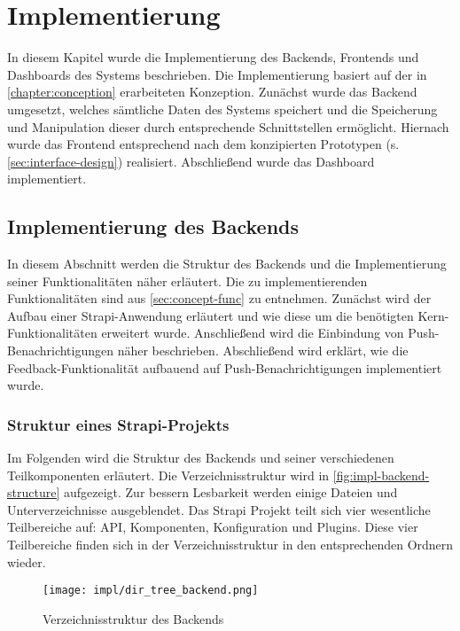 \chapter{Implementierung} \label{chapter:implementation}

In diesem Kapitel wurde die Implementierung des Backends, Frontends und
Dashboards des Systems beschrieben. Die Implementierung basiert auf der in
\autoref{chapter:conception} erarbeiteten Konzeption.  Zunächst wurde das
Backend umgesetzt, welches sämtliche Daten des Systems speichert und die
Speicherung und Manipulation dieser durch entsprechende Schnittstellen
ermöglicht. Hiernach wurde das Frontend entsprechend nach dem konzipierten
Prototypen (s. \autoref{sec:interface-design}) realisiert. Abschließend wurde
das Dashboard implementiert.

\section{Implementierung des Backends}

In diesem Abschnitt werden die Struktur des Backends und die Implementierung
seiner Funktionalitäten näher erläutert. Die zu implementierenden
Funktionalitäten sind aus \autoref{sec:concept-func} zu entnehmen. Zunächst wird
der Aufbau einer Strapi-Anwendung erläutert und wie diese um die benötigten
Kern-Funktionalitäten erweitert wurde. Anschließend wird die Einbindung von
Push-Benachrichtigungen näher beschrieben. Abschließend wird erklärt, wie die
Feedback-Funktionalität aufbauend auf Push-Benachrichtigungen implementiert
wurde.

\subsection{Struktur eines Strapi-Projekts} \label{ssec:impl-backend-structure}

Im Folgenden wird die Struktur des Backends und seiner verschiedenen
Teilkomponenten erläutert. Die Verzeichnisstruktur wird in
\autoref{fig:impl-backend-structure} aufgezeigt. Zur bessern Lesbarkeit werden
einige Dateien und Unterverzeichnisse ausgeblendet. Das Strapi Projekt teilt
sich vier wesentliche Teilbereiche auf: API, Komponenten, Konfiguration und
Plugins. Diese vier Teilbereiche finden sich in der Verzeichnisstruktur in den
entsprechenden Ordnern wieder.

\begin{figure}[htpb]
    \centering
    \texttt{[image: impl/dir\_tree\_backend.png]}
    \caption{Verzeichnisstruktur des Backends}
    \label{fig:impl-backend-structure}
\end{figure}


